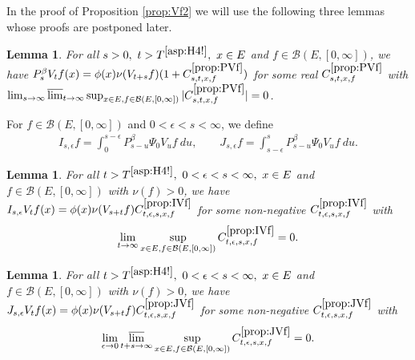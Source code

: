 \documentclass[12pt,a4paper]{amsart}
\numberwithin{equation}{section}
\theoremstyle{plain}
\newtheorem{lem}[thm]{Lemma}
\theoremstyle{definition}
\theoremstyle{remark}
\begin{document}
	In the proof of Proposition \ref{prop:Vf2} we will use the following three lemmas whose proofs are postponed later.

\begin{lem} \label{prop:PVf}
	For all $s> 0,~t> T^{\eqref{asp:H4!}},~ x\in E$ and $f\in \mathcal B(E,[0,\infty])$, we have $P_s^\beta V_t f(x) = \phi(x) \nu(V_{t+s}f) (1+C^{\ref{prop:PVf}}_{s,t,x,f})$ for some real $C^{\ref{prop:PVf}}_{s,t,x,f}$ with
	$\lim_{s\to \infty} \varlimsup_{t\to \infty} \sup_{x\in E, f\in \mathcal B(E,[0,\infty])}
	|C^{\ref{prop:PVf}}_{s,t,x,f}| = 0$.
\end{lem}

For $f\in \mathcal B(E,[0,\infty])$ and $0 < \epsilon < s < \infty$, we define
\begin{align}
	I_{s,\epsilon} f
 	= \int_0^{s - \epsilon} P_{s - u}^\beta \Psi_0 V_u f ~du, \qquad
 	J_{s,\epsilon} f
 	= \int_{s-\epsilon}^s P_{s-u}^\beta \Psi_0 V_u f ~du.
\end{align}
\begin{lem} \label{prop:IVf}
	For all $t> T^{\eqref{asp:H4!}},~0<\epsilon<s< \infty,~x\in E$ and $f\in \mathcal B(E,[0,\infty])$ with $\nu(f)>0$, we have $I_{s,\epsilon}V_t f(x) = \phi(x) \nu(V_{s+t} f) C^{\ref{prop:IVf}}_{t,\epsilon, s, x,f}$ for some non-negative $C^{\ref{prop:IVf}}_{t,\epsilon, s, x,f}$ with
\[
\lim_{t\to \infty} \sup_{x\in E, f\in \mathcal B(E,[0,\infty])}
C^{\ref{prop:IVf}}_{t,\epsilon, s, x,f} = 0.
\]
\end{lem}

\begin{lem} \label{prop:JVf}
For all $t>T^{\eqref{asp:H4!}},~0<\epsilon<s< \infty,~x\in E$ and $f\in \mathcal B(E,[0,\infty])$ with $\nu(f)>0$, we have $ J_{s,\epsilon} V_tf(x) = \phi(x) \nu(V_{s+t}f) C^{\ref{prop:JVf}}_{t,\epsilon,s,x,f}$ for some non-negative $C^{\ref{prop:JVf}}_{t,\epsilon,s,x,f}$ with
\[
\lim_{\epsilon \to 0}\varlimsup_{t+s\to \infty}
\sup_{x\in E, f\in \mathcal B(E,[0,\infty])}
C^{\ref{prop:JVf}}_{t,\epsilon,s,x,f} =0.
\]
\end{lem}
\end{document}
